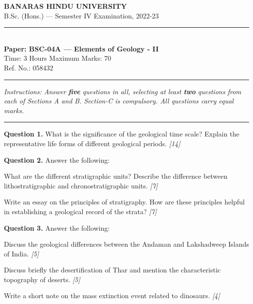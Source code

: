 \documentclass[11pt,a4paper]{article}
\newcommand{\pts}[1]{\hfill   \textit{[#1]}}
\begin{document}
\begin{center}
  {\large\bfseries BANARAS HINDU UNIVERSITY}\\[2pt]
  {\normalsize B.Sc. (Hons.) --- Semester IV Examination, 2022-23}\\[6pt]
  \rule{0.8\linewidth}{0.5pt}\\[6pt]
  {\large\bfseries Paper: BSC-04A --- Elements of Geology - II}\\[4pt]
  {\normalsize Time: 3 Hours \hfill Maximum Marks: 70}\\[2pt]
  {\small Ref. No.: 058432}
\end{center}
\rule{\linewidth}{0.4pt}
\smallskip



\noindent   \textit{Instructions: Answer   \textbf{five} questions in all, selecting at least   \textbf{two} questions from each of Sections A and B. Section-C is compulsory. All questions carry equal marks.}
\bigskip

\bigskip


\rule{\linewidth}{0.4pt}\smallskip




\noindent   \textbf{Question 1.} What is the significance of the geological time scale? Explain the representative life forms of different geological periods. \pts{14}

\medskip


\noindent   \textbf{Question 2.} Answer the following:

\begin{parts}
  \item What are the different stratigraphic units? Describe the difference between lithostratigraphic and chronostratigraphic units. \pts{7}
  \item Write an essay on the principles of stratigraphy. How are these principles helpful in establishing a geological record of the strata? \pts{7}
\end{parts}

\medskip


\noindent   \textbf{Question 3.} Answer the following:

\begin{parts}
  \item Discuss the geological differences between the Andaman and Lakshadweep Islands of India. \pts{5}
  \item Discuss briefly the desertification of Thar and mention the characteristic topography of deserts. \pts{5}
  \item Write a short note on the mass extinction event related to dinosaurs. \pts{4}
\end{parts}
\end{document}
